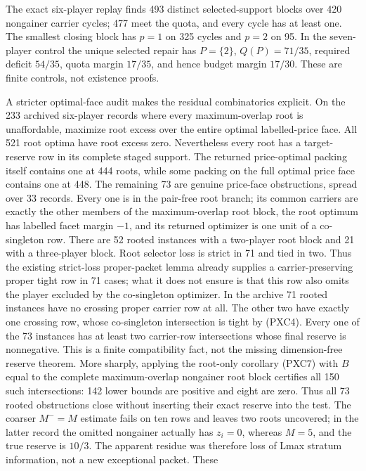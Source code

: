 \documentclass[11pt]{article}
\begin{document}
The exact six-player replay finds 493 distinct selected-support blocks over
420 nongainer carrier cycles; 477 meet the quota, and every cycle has at
least one.  The smallest closing block has $p=1$ on 325 cycles and $p=2$ on
95.  In the seven-player control the unique selected repair has $P=\{2\}$,
$Q(P)=71/35$, required deficit $54/35$, quota margin $17/35$, and hence
budget margin $17/30$.  These are finite controls, not existence proofs.

A stricter optimal-face audit makes the residual combinatorics explicit.  On
the 233 archived six-player records where every maximum-overlap root is
unaffordable, maximize root excess over the entire optimal labelled-price
face.  All 521 root optima have root excess zero.  Nevertheless every root
has a target-reserve row in its complete staged support.  The returned
price-optimal packing itself contains one at 444 roots, while some packing on
the full optimal price face contains one at 448.  The remaining 73 are
genuine price-face obstructions, spread over 33 records.  Every one is in the
pair-free root branch; its common carriers are exactly the other members of
the maximum-overlap root block, the root optimum has labelled facet margin
$-1$, and its returned optimizer is one unit of a co-singleton row.  There
are 52 rooted instances with a two-player root block and 21 with a
three-player block.  Root selector loss is strict in 71 and tied in two.
Thus the existing strict-loss proper-packet lemma already supplies a
carrier-preserving proper tight row in 71 cases; what it does not ensure is
that this row also omits the player excluded by the co-singleton optimizer.
In the archive 71 rooted instances have no crossing proper carrier row at
all.  The other two have exactly one crossing row, whose co-singleton
intersection is tight by (PXC4).  Every one of the 73 instances has at least
two carrier-row intersections whose final reserve is nonnegative.  This is a
finite compatibility fact, not the missing dimension-free reserve theorem.
More sharply, applying the root-only corollary (PXC7) with $B$ equal to the complete
maximum-overlap nongainer root block certifies all 150 such intersections:
142 lower bounds are positive and eight are zero.  Thus all 73 rooted
obstructions close without inserting their exact reserve into the test.  The
coarser $M^-=M$ estimate fails on ten rows and leaves two roots uncovered;
in the latter record the omitted nongainer actually has $z_i=0$, whereas
$M=5$, and the true reserve is $10/3$.  The apparent residue was therefore
loss of Lmax stratum information, not a new exceptional packet.  These
\end{document}
